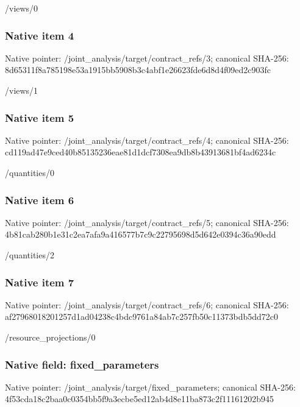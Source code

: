 \documentclass[10pt,a4paper]{article}
\begin{document}
/views/0


\subsubsection{Native item 4}


Native pointer: /joint\_analysis/target/contract\_refs/3; canonical SHA-256: 8d65311f8a785198e53a1915\allowbreak{}bb5908b3c4abf1e26623fde6\allowbreak{}d8d4f09ed2c903fc


/views/1


\subsubsection{Native item 5}


Native pointer: /joint\_analysis/target/contract\_refs/4; canonical SHA-256: cd119ad47e9ced40b8513523\allowbreak{}6eae81d1dcf7308ea9db8b43\allowbreak{}913681bf4ad6234c


/quantities/0


\subsubsection{Native item 6}


Native pointer: /joint\_analysis/target/contract\_refs/5; canonical SHA-256: 4b81cab280b1e31c2ea7afa9\allowbreak{}a416577b7c9c22795698d5d6\allowbreak{}42e0394c36a90edd


/quantities/2


\subsubsection{Native item 7}


Native pointer: /joint\_analysis/target/contract\_refs/6; canonical SHA-256: af27968018201257d1ad0423\allowbreak{}8c4bdc9761a84ab7c257fb50\allowbreak{}c11373bdb5dd72c0


/resource\_projections/0


\subsubsection{Native field: fixed\_parameters}


Native pointer: /joint\_analysis/target/fixed\_parameters; canonical SHA-256: 4f53cda18c2baa0c0354bb5f\allowbreak{}9a3ecbe5ed12ab4d8e11ba87\allowbreak{}3c2f11161202b945
\end{document}
